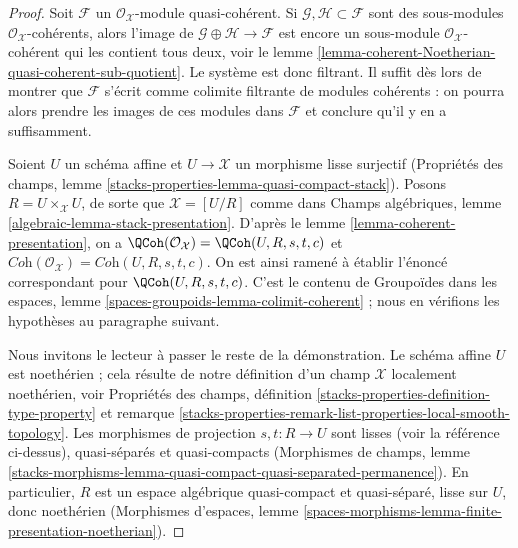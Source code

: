 \begin{proof}
Soit $\mathcal{F}$ un $\mathcal{O}_\mathcal{X}$-module quasi-cohérent.
Si $\mathcal{G}, \mathcal{H} \subset \mathcal{F}$ sont des sous-modules
$\mathcal{O}_\mathcal{X}$-cohérents, alors l'image de
$\mathcal{G} \oplus \mathcal{H} \to \mathcal{F}$ est encore un
sous-module $\mathcal{O}_\mathcal{X}$-cohérent qui les contient tous deux,
voir le lemme \ref{lemma-coherent-Noetherian-quasi-coherent-sub-quotient}.
Le système est donc filtrant.
Il suffit dès lors de montrer que $\mathcal{F}$ s'écrit comme
colimite filtrante de modules cohérents : on pourra alors prendre les
images de ces modules dans $\mathcal{F}$ et conclure qu'il y en a
suffisamment.

\medskip\noindent
Soient $U$ un schéma affine et $U \to \mathcal{X}$
un morphisme lisse surjectif (Propriétés des champs, lemme
\ref{stacks-properties-lemma-quasi-compact-stack}).
Posons $R = U \times_\mathcal{X} U$, de sorte que $\mathcal{X} = [U/R]$
comme dans Champs algébriques, lemme \ref{algebraic-lemma-stack-presentation}.
D'après le lemme \ref{lemma-coherent-presentation}, on a
$\QCoh(\mathcal{O}_\mathcal{X}) = \QCoh(U, R, s, t, c)$ et
$\textit{Coh}(\mathcal{O}_\mathcal{X}) = \textit{Coh}(U, R, s, t, c)$.
On est ainsi ramené à établir l'énoncé correspondant pour
$\QCoh(U, R, s, t, c)$. C'est le contenu de
Groupoïdes dans les espaces, lemme \ref{spaces-groupoids-lemma-colimit-coherent} ;
nous en vérifions les hypothèses au paragraphe suivant.

\medskip\noindent
Nous invitons le lecteur à passer le reste de la démonstration.
Le schéma affine $U$ est noethérien ; cela résulte de notre définition
d'un champ $\mathcal{X}$ localement noethérien, voir
Propriétés des champs, définition
\ref{stacks-properties-definition-type-property} et
remarque \ref{stacks-properties-remark-list-properties-local-smooth-topology}.
Les morphismes de projection $s, t : R \to U$ sont lisses (voir la référence
ci-dessus),
quasi-séparés et quasi-compacts (Morphismes de champs, lemme
\ref{stacks-morphisms-lemma-quasi-compact-quasi-separated-permanence}).
En particulier, $R$ est un espace algébrique quasi-compact et quasi-séparé,
lisse sur $U$, donc noethérien
(Morphismes d'espaces, lemme
\ref{spaces-morphisms-lemma-finite-presentation-noetherian}).
\end{proof}













